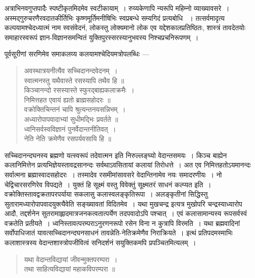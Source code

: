 {\dev अत्राभिनवगुप्तपादैः स्पष्टीकृतमिदमेव स्वटीकायाम्~। रुय्यकेणापि न्यरूपि महिम्नो व्याख्यावसरे~। अस्मद्गुरुचरणैरवदातकीर्तिभिः कृष्णमूर्तिमनीषिभिः स्वप्रबन्धे सम्यगिदं प्रत्यबोधि}  {\dev~। तत्सर्वमादृत्य कल्पयामश्चेदध्यात्मं नाम स्वसंवेदनं, लोकस्तु लोक्यमानो लोक एव यद्देशकालप्रतिष्ठितः, शास्त्रं तावदेतयोः समाहारस्वरूपं ज्ञान-विज्ञानसमन्वितं युक्तिपुरस्सरस्यानुभवस्य निश्चप्रचनिरूपणम्~।}   

{\dev पूर्वसूरीणां सरणिमेव समाकलय्य कलयामश्चेदियमत्रोपलब्धिः ---}
\begin{quote}
{\dev अवस्थात्रयनीत्यैव सच्चिदानन्दवेदनम्~।}\\
{\dev स्वात्मनस्तु यथैवास्ते रसस्यापि तथैव हि ॥}\\[5pt]
{\dev किञ्चानन्दो रसस्यास्ते स्फुरद्बाह्यकलाक्रमैः~।}\\
{\dev निमित्तहत एवायं ह्यतो ब्राह्मसहोदरः ॥}\\[5pt]
{\dev वक्रोक्तिचिन्तनं चापि श्रुत्यन्तनयसन्निभम्~।}\\
{\dev अध्यारोपापवादाभ्यां सुधीमद्भिः प्रवर्तते ॥}\\[5pt]
{\dev ध्वनिसर्वस्वविज्ञानं पुनर्वेदान्तनीतिवत्~।}\\
{\dev नेति नेति क्रमेणैव रसपर्यवसायि हि ॥}
\end{quote}

{\dev सच्चिदानन्दघनस्य ब्रह्मणो यत्स्वरूपं तदेवात्मन इति निरुल्लङ्घ्यो वेदान्तसमयः~। किञ्च बाह्येन कलानिमित्तेन प्रत्यभिज्ञेयस्तावद्रसानन्दः सर्वथाऽवसितायां कलायां तिरोधत्ते~। अत एव निमित्तहतोऽयमानन्दः सर्वात्मना ब्रह्मास्वादसहोदरः~। तस्मादेव रसमीमांसावसरे वेदान्तिनामेव नयः समादरणीयः~। नो चेद्विचारसरणिरेव विपद्यते~। युक्तं हि सूक्ष्मं वस्तु विवेक्तुं सूक्ष्मतरं साधनं कल्प्यत इति~। वक्रोक्तिस्तावद्वक्रतापरपर्याया सकलासु कलास्वलङ्कृतिरूपा~। अलङ्कृतीनां सिद्धिस्तु सुतारामध्यारोपापवादयुक्त्यैवेति सङ्ख्यावतां विदितमेव~। यथा मुखचन्द्र इत्यत्र मुखोपरि चन्द्रस्याध्यारोप आदौ, तद्दर्शनेन सुतरामाह्लादमात्रजनकत्वतात्पर्येण तदपवादोऽपि पश्चात्~।  एवं कलासामान्यस्य रूपसर्वस्वं वक्रतेति प्रतीयते~। ध्वनिस्तावत्परम्पराऽनुरणनरूपो रसेन विना न कुत्रापि विरमति~। यथा ब्रह्मवादिनां सर्वोपाधिजातं यावत्सच्चिदानन्दघनसाधनं तावन्नेति-नेतिक्रमेणैव निराक्रियते~। इत्थं प्रतिपदमस्माभिः कलाशास्त्रस्य वेदान्तशास्त्रोपजीवित्वं सनिदर्शनं सयुक्तिकमपि प्रपञ्चितमित्यलम्~।}
\begin{quote}
{\dev यथा वेदान्तविद्यायां जीवन्मुक्तपरम्परा~।}\\
{\dev तथा साहित्यविद्यायां महाकविपरम्परा ॥}
\end{quote}

